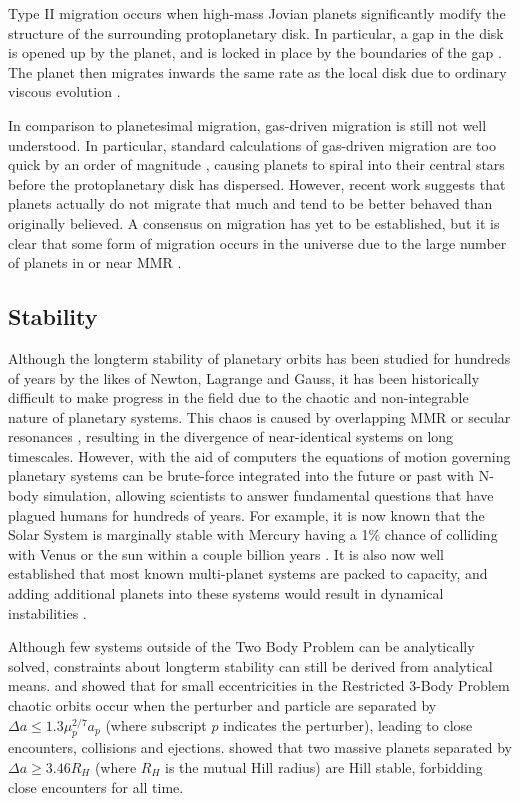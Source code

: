 \documentclass[12pt,letter]{aastex}
\begin{document}
Type II migration occurs when high-mass Jovian planets significantly modify the structure of the surrounding protoplanetary disk. 
In particular, a gap in the disk is opened up by the planet, and is locked in place by the boundaries of the gap \citep{Armitage2010}.
The planet then migrates inwards the same rate as the local disk due to ordinary viscous evolution \citep{Armitage2010}.  

In comparison to planetesimal migration, gas-driven migration is still not well understood. 
In particular, standard calculations of gas-driven migration are too quick by an order of magnitude \citep{Lin1986, Tanaka2002}, causing planets to spiral into their central stars before the protoplanetary disk has dispersed.
However, recent work \citep{Fung2017} suggests that planets actually do not migrate that much and tend to be better behaved than originally believed. 
A consensus on migration has yet to be established, but it is clear that some form of migration occurs in the universe due to the large number of planets in or near MMR \citep{Lissauer2011,Fabrycky2014,Steffen2015}.

\subsection{Stability}
Although the longterm stability of planetary orbits has been studied for hundreds of years by the likes of Newton, Lagrange and Gauss, it has been historically difficult to make progress in the field due to the chaotic and non-integrable nature of planetary systems.  
This chaos is caused by overlapping MMR or secular resonances \citep{Chirikov1979, Lecar2001}, resulting in the divergence of near-identical systems on long timescales. 
However, with the aid of computers the equations of motion governing planetary systems can be brute-force integrated into the future or past with N-body simulation, allowing scientists to answer fundamental questions that have plagued humans for hundreds of years. 
For example, it is now known that the Solar System is marginally stable \citep{Sussman1988, Laskar1994, Lecar2001} with Mercury having a 1\% chance of colliding with Venus or the sun within a couple billion years \citep{Laskar2009}.
It is also now well established that most known multi-planet systems are packed to capacity, and adding additional planets into these systems would result in dynamical instabilities \citep{Fang2013,Pu2015}.

Although few systems outside of the Two Body Problem can be analytically solved, constraints about longterm stability can still be derived from analytical means.
\citet{Wisdom1980} and \citet{Duncan1989} showed that for small eccentricities in the Restricted 3-Body Problem chaotic orbits occur when the perturber and particle are separated by $\Delta a \le 1.3\mu_p^{2/7}a_p$ (where subscript $p$ indicates the perturber), leading to close encounters, collisions and ejections. 
\citet{Gladman1993} showed that two massive planets separated by $\Delta a \ge 3.46 R_H$ (where $R_H$ is the mutual Hill radius) are Hill stable, forbidding close encounters for all time. 
\end{document}
